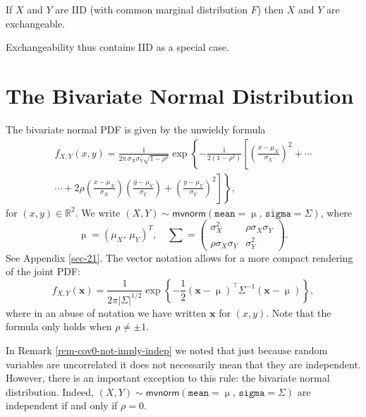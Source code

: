 \begin{prop}
If \(X\) and \(Y\) are IID (with common marginal distribution \(F\))
then \(X\) and \(Y\) are exchangeable.
\end{prop}

Exchangeability thus contains IID as a special case. 

\section{The Bivariate Normal Distribution}
\label{sec-7-6}

The bivariate normal PDF is given by the unwieldy formula
\begin{multline}
f_{X,Y}(x,y)=\frac{1}{2\pi\,\sigma_{X}\sigma_{Y}\sqrt{1-\rho^{2}}}\exp\left\{ -\frac{1}{2(1-\rho^{2})}\left[\left(\frac{x-\mu_{X}}{\sigma_{X}}\right)^{2}+\cdots\right.\right.\\
\left.\left.\cdots+2\rho\left(\frac{x-\mu_{X}}{\sigma_{X}}\right)\left(\frac{y-\mu_{Y}}{\sigma_{Y}}\right)+\left(\frac{y-\mu_{Y}}{\sigma_{Y}}\right)^{2}\right]\right\} ,
\end{multline}
for \((x,y)\in\mathbb{R}^{2}\). We write \((X,Y)\sim\mathsf{mvnorm}(\mathtt{mean}=\upmu,\,\mathtt{sigma}=\Sigma)\), where
\begin{equation}
\upmu=(\mu_{X},\,\mu_{Y})^{T},\quad \sum=\left(
\begin{array}{cc}
\sigma_{X}^{2} & \rho\sigma_{X}\sigma_{Y}\\
\rho\sigma_{X}\sigma_{Y} & \sigma_{Y}^{2}
\end{array}
\right).
\end{equation}
See Appendix \ref{sec-21}. The vector notation allows for a
more compact rendering of the joint PDF:
\begin{equation}
f_{X,Y}(\mathbf{x})=\frac{1}{2\pi\left|\Sigma\right|^{1/2}}\exp\left\{ -\frac{1}{2}\left(\mathbf{x}-\upmu\right)^{\top}\Sigma^{-1}\left(\mathbf{x}-\upmu\right)\right\} ,
\end{equation}
where in an abuse of notation we have written \(\mathbf{x}\) for
\((x,y)\). Note that the formula only holds when \(\rho\neq\pm1\).

\begin{rem}
In Remark \ref{rem-cov0-not-imply-indep} we noted that just because random
variables are uncorrelated it does not necessarily mean that they are
independent. However, there is an important exception to this rule:
the bivariate normal distribution. Indeed,
\((X,Y)\sim\mathsf{mvnorm}(\mathtt{mean}=\upmu,\,\mathtt{sigma}=\Sigma)\)
are independent if and only if \(\rho=0\).
\end{rem}

